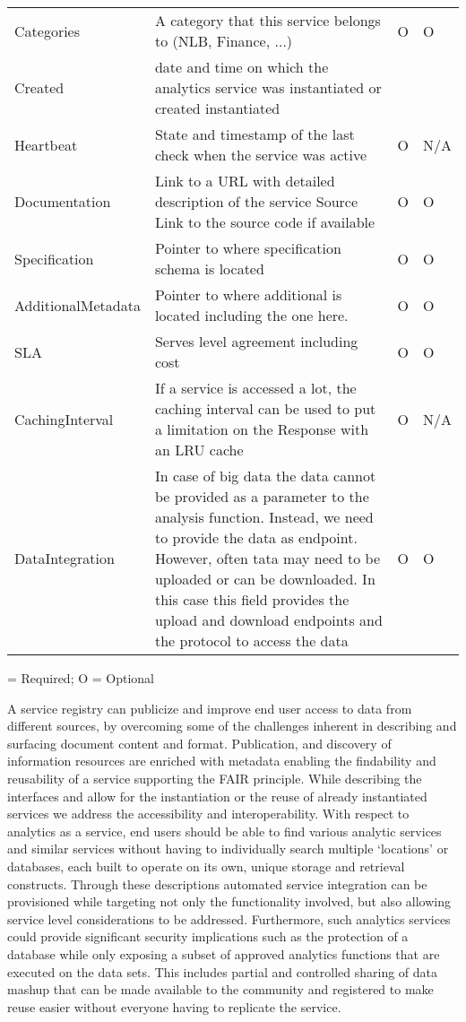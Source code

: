 \begin{table}[htb]
{\begin{tabular}{p{3cm}p{11cm}p{0.5cm}p{0.5cm}}
Categories &	A category that this service belongs to (NLB, Finance, ...)	& O & O \\
Created	& date and time on which the analytics service was instantiated or created	instantiated	& \OK & \OK \\
Heartbeat &	State and timestamp of the last check when the service was active	& O & 	N/A \\
Documentation &	Link to a URL with detailed description of the service
Source	Link to the source code if available	& O & O \\
Specification &	Pointer to where specification schema is located	& O &  O \\
AdditionalMetadata	& Pointer to where additional is located including the one here.	& O &	O \\
SLA	& Serves level agreement including cost	& O 	& O \\
CachingInterval	&If a service is accessed a lot, the caching interval can be used to put a limitation on the Response with an LRU cache	& O &	N/A \\
DataIntegration &	In case of big data the data cannot be provided as a parameter to the analysis function. Instead, we need to provide the data as endpoint. However, often tata may need to be uploaded or can be downloaded. In this case this field provides the upload and download endpoints and the protocol to access the data	& O &	O \\
\hline
\end{tabular}
}
\OK = Required; O = Optional
\end{table}


A service registry can publicize and improve end user access to data
from different sources, by overcoming some of the challenges inherent
in describing and surfacing document content and format. Publication,
and discovery of information resources are enriched with metadata
enabling the findability and reusability of a service supporting the
FAIR principle. While describing the interfaces and allow for the
instantiation or the reuse of already instantiated services we address
the accessibility and interoperability. With respect to analytics as a
service, end users should be able to find various analytic services
and similar services without having to individually search multiple
‘locations’ or databases, each built to operate on its own, unique
storage and retrieval constructs. Through these descriptions automated
service integration can be provisioned while targeting not only the
functionality involved, but also allowing service level considerations
to be addressed. Furthermore, such analytics services could provide
significant security implications such as the protection of a database
while only exposing a subset of approved analytics functions that are
executed on the data sets. This includes partial and controlled
sharing of data mashup that can be made available to the community and
registered to make reuse easier without everyone having to replicate
the service.

